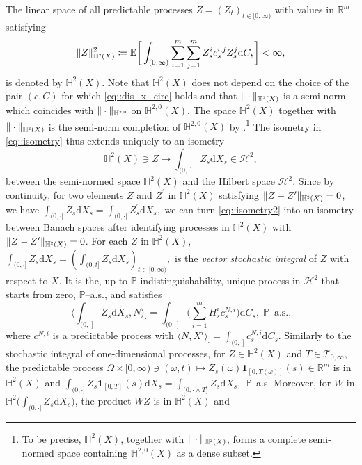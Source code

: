 \documentclass[10pt]{article} %
\newcommand\cH{\mathcal H}
\newcommand\cT{\mathcal T}
\newcommand{\smalltext}[1]{\text{\fontsize{4}{4}\selectfont$#1$}}
\def \E{\mathbb{E}}
\def \H{\mathbb{H}}
\def \P{\mathbb{P}}
\def \R{\mathbb{R}}
\newcommand{\1}{\mathbf{1}}
\def\d{\mathrm{d}}
\begin{document}
The linear space of all predictable processes $Z = (Z_t)_{t \in [0,\infty)}$ with values in $\R^m$ satisfying
\begin{equation*}
	\|Z\|^2_{\H^\smalltext{2}(X)} \coloneqq \E \bigg[ \int_{(0,\infty)}  \sum_{i=1}^m\sum_{j=1}^m Z^i_s c^{i,j}_s Z^j_s  \d C_s \bigg] < \infty,
\end{equation*}
is denoted by $\H^2(X)$. Note that $\H^2(X)$ does not depend on the choice of the pair $(c,C)$ for which \eqref{eq::dis_x_circ} holds and that $\|\cdot\|_{\H^\smalltext{2}(X)}$ is a semi-norm which coincides with $\|\cdot\|_{\H^{\smalltext{2}\smalltext{,}\smalltext{0}}}$ on $\H^{2,0}(X)$. The space $\H^2(X)$ together with $\|\cdot\|_{\H^\smalltext{2}(X)}$ is the semi-norm completion of $\H^{2,0}(X)$ by \cite[Th\'eor\`eme 4.35]{jacod1979calcul}.\footnote{To be precise, $\mathbb{H}^{2}(X)$, together with $\|\cdot \|_{\mathbb{H}^{\text{\fontsize{4}{4}\selectfont $2$}}(X)}$, forms a complete semi-normed space containing $\mathbb{H}^{2,0}(X)$ as a dense subset.} The isometry in \eqref{eq::isometry} thus extends uniquely to an isometry
\begin{equation}\label{eq::isometry2}
	\H^2(X) \ni Z \longmapsto \int_{(0,\cdot]} Z_s \d X_s \in \cH^2,
\end{equation}
between the semi-normed space $\H^2(X)$ and the Hilbert space $\cH^2$. Since by continuity, for two elements $Z$ and $Z^\prime$ in $\H^2(X)$ satisfying $\|Z - Z^\prime\|_{\H^\smalltext{2}(X)} = 0$, we have $\int_{(0,\cdot]} Z_s \d X_s = \int_{(0,\cdot]} Z^\prime_s \d X_s,$ we can turn \eqref{eq::isometry2} into an isometry between Banach spaces after identifying processes in $\H^2(X)$ with $\|Z-Z^\prime\|_{\H^\smalltext{2}(X)} = 0$. For each $Z$ in $\H^2(X)$, $\int_{(0,\cdot]} Z_s \d X_s = ( \int_{(0,t]} Z_s \d X_s)_{t \in [0,\infty)},$ is the \emph{vector stochastic integral} of $Z$ with respect to $X$. It is the, up to $\P$-indistinguishability, unique process in $\cH^2$ that starts from zero, $\P$--a.s., and satisfies
\begin{equation*}
	\bigg\langle \int_{(0,\cdot]} Z_s \d X_s , N \bigg\rangle_\cdot = \int_{(0,\cdot]}\bigg( \sum_{i = 1}^m H^i_s c^{N,i}_s \bigg) \d C_s, \; \text{$\P$--a.s.,}
\end{equation*}
where $c^{N,i}$ is a predictable process with $\langle N, X^i \rangle_\cdot = \int_{(0,\cdot]} c^{N,i}_s \d C_s$. Similarly to the stochastic integral of one-dimensional processes, for $Z \in \H^2(X)$ and $T \in \cT_{0,\infty}$, the predictable process $\Omega \times [0,\infty) \ni (\omega,t) \longmapsto Z_s(\omega)\mathbf{1}_{[0,T(\omega)]}(s) \in \R^m$ is in $\H^2(X)$ and $\int_{(0,\cdot]} Z_s \mathbf{1}_{[0,T]}(s) \d X_s = \int_{(0,\cdot \land T]} Z_s \d X_s,$ $\P$--a.s. Moreover, for $W$ in $\H^2 \big(\int_{(0,\cdot]}Z_s \d X_s \big)$, the product $W Z$ is in $\H^2(X)$ and
\end{document}

